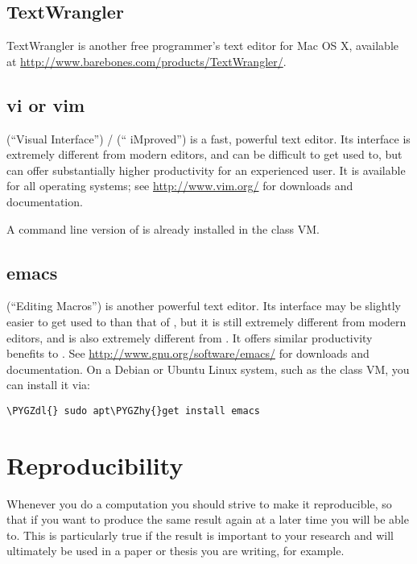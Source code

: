 \documentclass[letterpaper,10pt,english]{sphinxmanual}
\def\PYGZdl{\char`\$}
\def\PYGZhy{\char`\-}
\begin{document}
\subsection{TextWrangler}
\label{editors:textwrangler}
TextWrangler is another free programmer's text editor for Mac OS X,
available at \url{http://www.barebones.com/products/TextWrangler/}.


\subsection{vi or vim}
\label{editors:vi-or-vim}
 (``Visual Interface'') /  (`` iMproved'') is a fast,
powerful text editor.  Its interface is extremely different from
modern editors, and can be difficult to get used to, but  can
offer substantially higher productivity for an experienced user.  It
is available for all operating systems; see \url{http://www.vim.org/}
for downloads and documentation.

A command line version of  is already installed in the class VM.


\subsection{emacs}
\label{editors:emacs}
 (``Editing Macros'') is another powerful text editor.  Its
interface may be slightly easier to get used to than that of ,
but it is still extremely different from modern editors, and is also
extremely different from .  It offers similar productivity
benefits to .  See \url{http://www.gnu.org/software/emacs/} for
downloads and documentation.  On a Debian or Ubuntu Linux system, such
as the class VM, you can install it via:

\begin{Verbatim}[commandchars=\\\{\}]
\PYGZdl{} sudo apt\PYGZhy{}get install emacs
\end{Verbatim}


\section{Reproducibility}
\label{reproducibility:reproducibility}\label{reproducibility::doc}\label{reproducibility:id1}
Whenever you do a computation you should strive to make it reproducible, so
that if you want to produce the same result again at a later time you will
be able to.  This is particularly true if the result is important to
your research and will ultimately be used in a paper or thesis
you are writing, for example.
\end{document}
